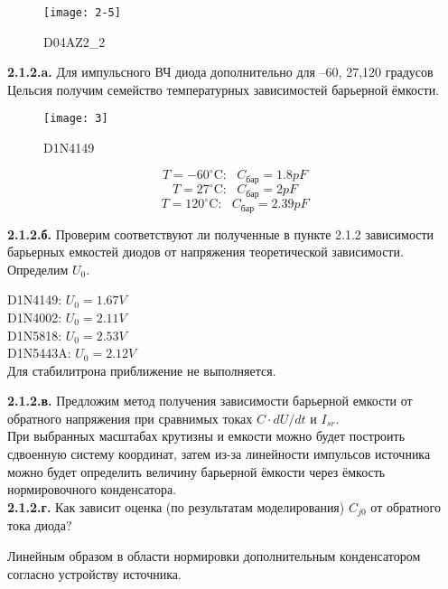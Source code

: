 \documentclass{semi}
\newcommand{\Cd}{^{\circ}\mathrm{C}}
\begin{document}
\begin{figure}[H]
	\centering
	\texttt{[image: 2-5]}
	\caption{D04AZ2\_2}
\end{figure}


\textbf{{\normalsize 2.1.2.a.}}
Для импульсного ВЧ диода дополнительно для –60, 27,120 градусов Цельсия получим семейство температурных зависимостей барьерной ёмкости.

\begin{figure}[H]
	\centering
	\texttt{[image: 3]}
	\caption{D1N4149}
\end{figure}

\begin{center}
	\[T=-60 \Cd: ~~~ C_{бар}=1.8pF\]
	\[T= 27 \Cd: ~~~ C_{бар}=2pF\]
	\[T=120 \Cd: ~~~ C_{бар}=2.39pF\]
\end{center}

\textbf{{\normalsize 2.1.2.б.}}
Проверим соответствуют ли полученные в пункте 2.1.2 зависимости барьерных емкостей диодов от напряжения теоретической зависимости. Определим $ U_0 $.\\

\begin{center}
	D1N4149:  $U_0 = 1.67 V$ \\
	D1N4002:  $U_0 = 2.11 V$ \\	
	D1N5818:  $U_0 = 2.53 V$ \\
	D1N5443A: $U_0 = 2.12 V$ \\
	Для стабилитрона приближение не выполняется.
\end{center}

\textbf{{\normalsize 2.1.2.в.}}
Предложим метод получения зависимости барьерной емкости от обратного напряжения при сравнимых токах $C \cdot dU/dt$ и $I_{sr}$.\\

При выбранных масштабах крутизны и емкости можно будет построить сдвоенную систему координат, затем из-за линейности импульсов источника можно будет определить величину барьерной ёмкости через ёмкость нормировочного конденсатора.\\

\textbf{{\normalsize 2.1.2.г.}}
Как зависит оценка (по результатам моделирования) $C_{j0}$ от обратного тока диода?

Линейным образом в области нормировки дополнительным конденсатором согласно устройству источника.

\newpage
\end{document}

